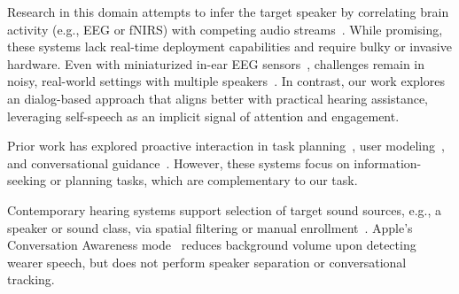 \vskip 0.02in  
 Research in this domain  attempts to infer the target speaker by correlating brain activity (e.g., EEG or fNIRS) with competing audio streams~\cite{aad1, Choudhari2024.02.05.579018,aad2}. While promising, these systems lack real-time deployment capabilities and require bulky or invasive hardware. Even with miniaturized in-ear EEG sensors~\cite{cEEGrid,berkeleyearable}, challenges remain in noisy, real-world settings with multiple speakers~\cite{separationeeg}. In contrast, our work explores an dialog-based approach that aligns better with practical hearing assistance, leveraging self-speech as an implicit signal of attention and engagement.


\vskip 0.02in 
 Prior work has explored proactive interaction in task planning~\cite{zhang-etal-2024-ask}, user modeling~\cite{lu2024proactiveagentshiftingllm}, and conversational guidance~\cite{llamapie}. However, these systems focus on information-seeking or planning tasks, which are complementary to our task.


\vskip 0.02in 
Contemporary hearing systems support  selection of target sound sources, e.g., a speaker or sound class, via  spatial filtering or manual enrollment~\cite{semantichearing, tsh,soundbubble,knowledgeboosting}. Apple’s Conversation Awareness mode~\cite{apple-conversationawareness} reduces background volume upon detecting wearer speech, but does not perform speaker separation or conversational tracking. %

